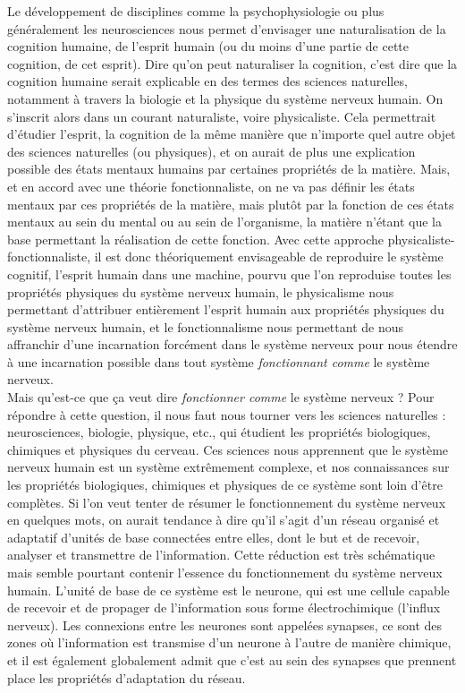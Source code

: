 \documentclass[12pt]{scrartcl}
\begin{document}
Le développement de disciplines comme la psychophysiologie ou plus généralement les neurosciences nous permet d'envisager une naturalisation de la cognition humaine, de l'esprit humain (ou du moins d'une partie de cette cognition, de cet esprit). Dire qu'on peut naturaliser la cognition, c'est dire que la cognition humaine serait explicable en des termes des sciences naturelles, notamment à travers la biologie et la physique du système nerveux humain. On s'inscrit alors dans un courant naturaliste, voire physicaliste. Cela permettrait d'étudier l'esprit, la cognition de la même manière que n'importe quel autre objet des sciences naturelles (ou physiques), et on aurait de plus une explication possible des états mentaux humains par certaines propriétés de la matière. Mais, et en accord avec une théorie fonctionnaliste, on ne va pas définir les états mentaux par ces propriétés de la matière, mais plutôt par la fonction de ces états mentaux au sein du mental ou au sein de l'organisme, la matière n'étant que la base permettant la réalisation de cette fonction. Avec cette approche physicaliste-fonctionnaliste, il est donc théoriquement envisageable de reproduire le système cognitif, l'esprit humain dans une machine, pourvu que l'on reproduise toutes les propriétés physiques du système nerveux humain, le physicalisme nous permettant d'attribuer entièrement l'esprit humain aux propriétés physiques du système nerveux humain, et le fonctionnalisme nous permettant de nous affranchir d'une incarnation forcément dans le système nerveux pour nous étendre à une incarnation possible dans tout système \textit{fonctionnant comme} le système nerveux. \\

Mais qu'est-ce que ça veut dire \textit{fonctionner comme} le système nerveux ? Pour répondre à cette question, il nous faut nous tourner vers les sciences naturelles : neurosciences, biologie, physique, etc., qui étudient les propriétés biologiques, chimiques et physiques du cerveau. Ces sciences nous apprennent que le système nerveux humain est un système extrêmement complexe, et nos connaissances sur les propriétés biologiques, chimiques et physiques de ce système sont loin d'être complètes. Si l'on veut tenter de résumer le fonctionnement du système nerveux en quelques mots, on aurait tendance à dire qu'il s'agit d’un réseau organisé et adaptatif d'unités de base connectées entre elles, dont le but et de recevoir, analyser et transmettre de l'information. Cette réduction est très schématique mais semble pourtant contenir l'essence du fonctionnement du système nerveux humain. L'unité de base de ce système est le neurone, qui est une cellule capable de recevoir et de propager de l'information sous forme électrochimique (l'influx nerveux). Les connexions entre les neurones sont appelées synapses, ce sont des zones où l'information est transmise d'un neurone à l'autre de manière chimique, et il est également globalement admit que c'est au sein des synapses que prennent place les propriétés d'adaptation du réseau.\\
\end{document}
